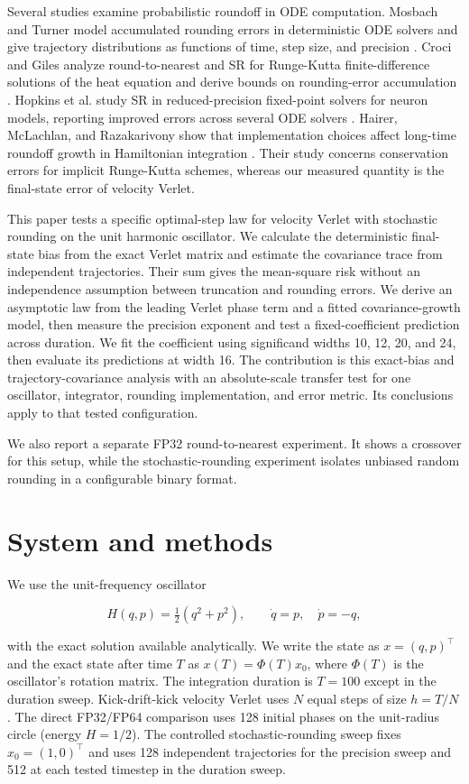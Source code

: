 \documentclass[
11pt
]{article}
\begin{document}
Several studies examine probabilistic roundoff in ODE computation.
Mosbach and Turner model accumulated rounding errors in deterministic
ODE solvers and give trajectory distributions as functions of time, step
size, and precision \cite{mosbach2009}. Croci and Giles analyze round-to-nearest and SR
for Runge-Kutta finite-difference solutions of the heat equation and
derive bounds on rounding-error accumulation \cite{crocigiles2023}. Hopkins et al. study
SR in reduced-precision fixed-point solvers for neuron models, reporting
improved errors across several ODE solvers \cite{hopkins2020}.
Hairer, McLachlan, and Razakarivony show that implementation choices
affect long-time roundoff growth in Hamiltonian integration \cite{hairer2008}. Their
study concerns conservation errors for implicit Runge-Kutta schemes,
whereas our measured quantity is the final-state error of velocity
Verlet.

This paper tests a specific optimal-step law for velocity Verlet with
stochastic rounding on the unit harmonic oscillator. We calculate the
deterministic final-state bias from the exact Verlet matrix and estimate
the covariance trace from independent trajectories. Their sum gives the
mean-square risk without an independence assumption between truncation
and rounding errors. We derive an asymptotic law from the leading Verlet
phase term and a fitted covariance-growth model, then measure the
precision exponent and test a fixed-coefficient prediction across
duration. We fit the coefficient using significand widths 10, 12, 20,
and 24, then evaluate its predictions at width 16. The contribution is
this exact-bias and trajectory-covariance analysis with an absolute-scale
transfer test for one oscillator, integrator, rounding implementation,
and error metric. Its conclusions apply to that tested configuration.

We also report a separate FP32 round-to-nearest experiment. It shows a
crossover for this setup, while the stochastic-rounding experiment
isolates unbiased random rounding in a configurable binary format.

\section{System and methods}\label{system-and-methods}

We use the unit-frequency oscillator

\[
H(q,p)=\tfrac12(q^2+p^2),\qquad \dot q=p,\quad \dot p=-q,
\]

with the exact solution available analytically. We write the state as
\(x=(q,p)^\top\) and the exact state after time \(T\) as
\(x(T)=\Phi(T)x_0\), where \(\Phi(T)\) is the oscillator's rotation
matrix. The integration duration is \(T=100\) except in the duration
sweep. Kick-drift-kick velocity Verlet uses \(N\) equal steps of size
\(h=T/N\). The direct FP32/FP64 comparison uses 128 initial phases on
the unit-radius circle (energy \(H=1/2\)). The controlled stochastic-rounding sweep fixes
\(x_0=(1,0)^\top\) and uses 128 independent trajectories for the
precision sweep and 512 at each tested timestep in the duration sweep.
\end{document}
